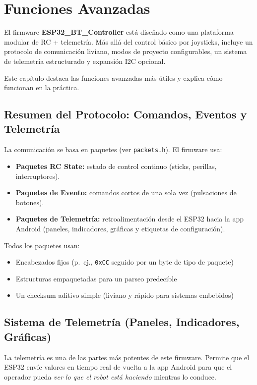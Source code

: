 \chapter{Funciones Avanzadas}
\label{ch:advanced-features}

El firmware \textbf{ESP32\_BT\_Controller} está diseñado como una plataforma modular de RC + telemetría.
Más allá del control básico por joysticks, incluye un protocolo de comunicación liviano, modos de proyecto
configurables, un sistema de telemetría estructurado y expansión I2C opcional.

Este capítulo destaca las funciones avanzadas más útiles y explica cómo funcionan en la práctica.

\section{Resumen del Protocolo: Comandos, Eventos y Telemetría}
\label{sec:protocol-overview}

La comunicación se basa en paquetes (ver \texttt{packets.h}). El firmware usa:

\begin{itemize}
    \item \textbf{Paquetes RC State:} estado de control continuo (sticks, perillas, interruptores).
    \item \textbf{Paquetes de Evento:} comandos cortos de una sola vez (pulsaciones de botones).
    \item \textbf{Paquetes de Telemetría:} retroalimentación desde el ESP32 hacia la app Android (paneles, indicadores, gráficas y etiquetas de configuración).
\end{itemize}

Todos los paquetes usan:
\begin{itemize}
    \item Encabezados fijos (p.\ ej., \texttt{0xCC} seguido por un byte de tipo de paquete)
    \item Estructuras empaquetadas para un parseo predecible
    \item Un checksum aditivo simple (liviano y rápido para sistemas embebidos)
\end{itemize}

\section{Sistema de Telemetría (Paneles, Indicadores, Gráficas)}
\label{sec:telemetry}

La telemetría es una de las partes más potentes de este firmware. Permite que el ESP32 envíe
valores en tiempo real de vuelta a la app Android para que el operador pueda \emph{ver lo que el robot está haciendo}
mientras lo conduce.

